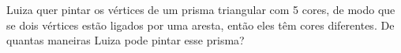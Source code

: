 Luiza quer pintar os vértices de um prisma triangular com 5 cores, de modo que se dois vértices estão ligados por uma aresta, então eles têm cores diferentes.
De quantas maneiras Luiza pode pintar esse prisma?